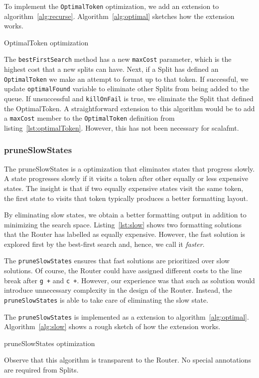 To implement the \texttt{OptimalToken} optimization, we add an extension to algorithm~\ref{alg:recurse}.
Algorithm~\ref{alg:optimal} sketches how the extension works.
\begin{algorithm}
  \caption{OptimalToken optimization}\label{alg:optimal}
  
\end{algorithm}
The \texttt{bestFirstSearch} method has a new \texttt{maxCost} parameter, which is the highest cost that a new splits can have.
Next, if a Split has defined an \texttt{OptimalToken} we make an attempt to format up to that token.
If successful, we update \texttt{optimalFound} variable to eliminate other Splits from being added to the queue.
If unsuccessful and \texttt{killOnFail} is true, we eliminate the Split that defined the OptimalToken.
A straightforward extension to this algorithm would be to add a \texttt{maxCost} member to the \texttt{OptimalToken} definition from listing~\ref{lst:optimalToken}.
However, this has not been necessary for scalafmt.

\subsubsection{pruneSlowStates}
The pruneSlowStates is a optimization that eliminates states that progress slowly.
A state progresses slowly if it visits a token after other equally or less expensive states.
The insight is that if two equally expensive states visit the same token, the first state to visits that token typically produces a better formatting layout.

By eliminating slow states, we obtain a better formatting output in addition to minimizing the search space.
Listing~\ref{lst:slow} shows two formatting solutions that the Router has labelled as equally expensive.
However, the fast solution is explored first by the best-first search and, hence, we call it \emph{faster}.

The \texttt{pruneSlowStates} ensures that fast solutions are prioritized over slow solutions.
Of course, the Router could have assigned different costs to the line break after \texttt{g +} and \texttt{c +}.
However, our experience was that such as solution would introduce unnecessary complexity in the design of the Router.
Instead, the \texttt{pruneSlowStates} is able to take care of eliminating the slow state.

The \texttt{pruneSlowStates} is implemented as a extension to algorithm~\ref{alg:optimal}.
Algorithm~\ref{alg:slow} shows a rough sketch of how the extension works.
\begin{algorithm}[H]
  \caption{pruneSlowStates optimization}\label{alg:slow}
  
\end{algorithm}
Observe that this algorithm is transparent to the Router.
No special annotations are required from Splits.

